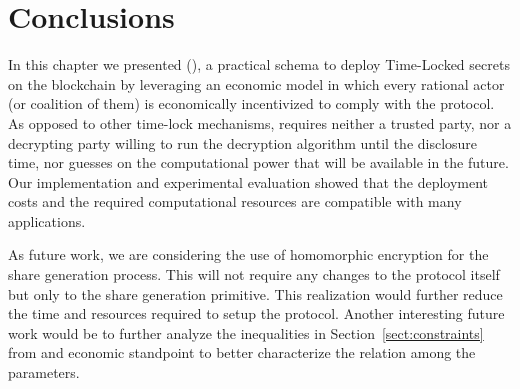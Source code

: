 \section{Conclusions}\label{sect:conclusions}

In this chapter we presented \name (\shortname), a practical schema to deploy Time-Locked secrets on the blockchain by leveraging an economic model in which every rational actor (or coalition of them) is economically incentivized to comply with the protocol.
As opposed to other time-lock mechanisms, \shortname requires neither a trusted party, nor a decrypting party willing to run the decryption algorithm until the disclosure time, nor guesses on the computational power that will be available in the future.
Our implementation and experimental evaluation showed that the deployment costs and the required computational resources are compatible with many applications.

As future work, we are considering the use of homomorphic encryption for the share generation process. This will not require any changes to the protocol itself but only to the share generation primitive. This realization would further reduce the time and resources required to setup the \shortname protocol. Another interesting future work would be to further analyze the inequalities in Section~\ref{sect:constraints} from and economic standpoint to better characterize the relation among the parameters.
